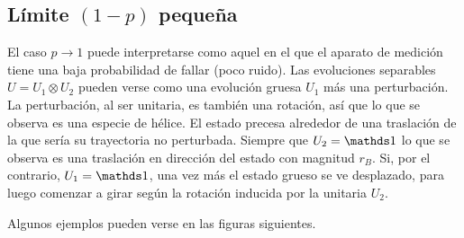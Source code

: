 \subsection{Límite $(1-p)$ pequeña}
El caso $p\rightarrow 1$ puede interpretarse como aquel en el que el aparato de medición tiene una baja probabilidad de fallar (poco ruido). Las evoluciones separables $U=U_{1}\otimes U_{2}$ pueden verse como una evolución gruesa $U_{1}$ más una perturbación. La perturbación, al ser unitaria, es también una rotación, así que lo que se observa es una especie de hélice. El estado precesa alrededor de una traslación de la que sería su trayectoria no perturbada. Siempre que $U_{2}=\Id$ lo que se observa es una traslación en dirección del estado con magnitud $r_{B}$. Si, por el contrario, $U_{1}=\Id$, una vez más el estado grueso se ve desplazado, para luego comenzar a girar según la rotación inducida por la unitaria $U_{2}$. 

Algunos ejemplos pueden verse en las figuras siguientes.

